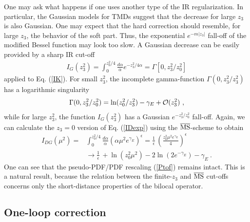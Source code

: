 \documentclass[aps,prd,twocolumn,showpacs,preprintnumbers,superscriptaddress]{revtex4-1}
\newcommand{\nn}{\nonumber \\ }
\begin{document}
One may ask what happens  if one uses another type of    the IR regularization.
In particular,  the  Gaussian models for TMDs suggest that the 
decrease for large  $z_3$ is also Gaussian.  One may expect  
 that    the hard correction
should resemble,  for  large $z_3$,  the behavior of the soft part.  
  Thus,   the exponential $e^{-m|z_3|}$ fall-off of the modified 
Bessel function may  look   too slow. 
A  Gaussian decrease can  be easily  provided by a sharp IR cut-off  
    \begin{align} 
  I_G (z_3^2) = \int_0^{z_0^2/4}  \frac{d\alpha}{\alpha}    e^{-z_3^2/4\alpha } = \Gamma [0,z_3^2/z_0^2]
  \label{IDexp}
     \end{align} 
applied to  Eq. (\ref{IK}).  For small $z_3^2$,  the incomplete 
gamma-function  $ \Gamma (0,z_3^2/z_3^2)$   has a logarithmic singularity
   \begin{align} 
  \Gamma (0,z_3^2/z_0^2) =  \ln (z_0^2/z_3^2) -  \gamma_E + {\cal O} (z_3^2)  \  ,
  \label{Dexp0}
     \end{align} 
     while for large $z_3^2$, the function  $I_G (z_3^2)$  has  a Gaussian  $e^{-z_3^2/z_0^2}$  fall-off.  
Again, we  can  calculate the $z_3=0$ version of 
Eq. (\ref{IDexp})  using the $\overline{\rm MS}$-scheme to obtain 
  \begin{align} 
  I_{DG} (\mu^2) = & \int_0^{z_0^2/4}  \frac{d\alpha}{\alpha}  (\alpha \mu^2  e^{\gamma_E})^{\epsilon}    = 
  \frac1{\epsilon} \,  \left (\frac{ z_0^2  \mu^2  e^{\gamma_E}}{4}  \right )^{\epsilon} \nn & 
  \to  \frac1{\epsilon} \, + \ln (z_0^2 \mu^2    ) -2  \ln ( 2 e^{-\gamma_E}) -  \gamma_E \ . 
  \label{IDexp2}
     \end{align} 
One can see that the pseudo-PDF/PDF rescaling (\ref{Ptof}) remains intact. 
This   is a natural result, because the   relation between the finite-$z_3$ 
and $\overline{\rm MS}$  cut-offs  concerns only the short-distance  properties 
of  the bilocal operator. 


\subsection{One-loop correction} 
 
\end{document}
